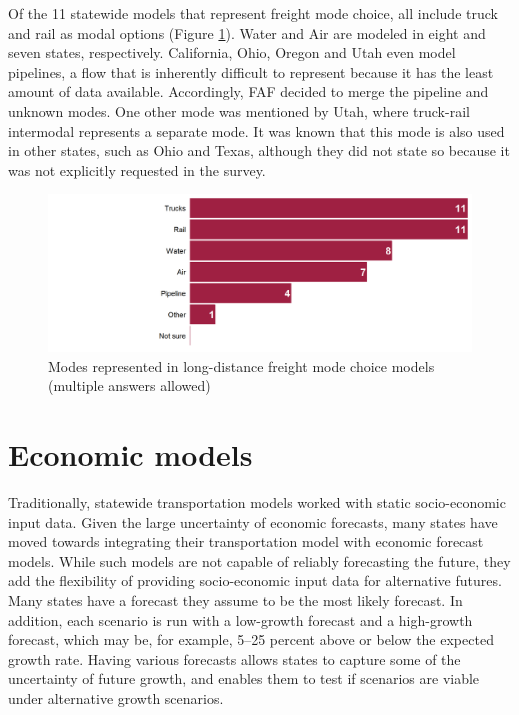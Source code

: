 Of the 11 statewide models that represent freight mode choice, all include truck and rail as modal options (Figure \ref{fig:freight-long-distance-modes}). Water and Air are modeled in eight and seven states, respectively. California, Ohio, Oregon and Utah even model pipelines, a flow that is inherently difficult to represent because it has the least amount of data available. Accordingly, FAF decided to merge the pipeline and unknown modes. One other mode was mentioned by Utah, where truck-rail intermodal represents a separate mode. It was known that this mode is also used in other states, such as Ohio and Texas, although they did not state so because it was not explicitly requested in the survey.

\begin{figure}   %
\centering
\includegraphics[width=6.4in]{graphics/26-freight-long-distance-modes}
\caption[Modes represented in long-distance freight mode choice models]{Modes represented in long-distance freight mode choice models (multiple answers allowed)}
\label{fig:freight-long-distance-modes}
\end{figure}

\section{Economic models}

Traditionally, statewide transportation models worked with static socio-economic input data. Given the large uncertainty of economic forecasts, many states have moved towards integrating their transportation model with economic forecast models. While such models are not capable of reliably forecasting the future, they add the flexibility of providing socio-economic input data for alternative futures. Many states have a forecast they assume to be the most likely forecast. In addition, each scenario is run with a low-growth forecast and a high-growth forecast, which may be, for example, 5--25 percent above or below the expected growth rate. Having various forecasts allows states to capture some of the uncertainty of future growth, and enables them to test if scenarios are viable under alternative growth scenarios.

